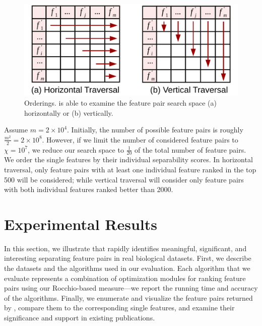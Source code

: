 
\begin{figure}[h]
 \centering
 \vspace{-5mm}
 \includegraphics[width=0.85\linewidth]{fig/traversal.pdf}
 \vspace{-5mm}
\caption{\traversal Orderings. \genviz is able to examine the feature pair search space (a) horizontally or (b) vertically.}
\vspace{-5mm}
\label{fig:traversal}
\end{figure}

\begin{example}[\traversal]
Assume $m=2\times 10^4$. Initially, the number of possible feature pairs is roughly $\frac{m^2}{2}=2\times 10^8$. However, if we limit the number of considered feature pairs to $\chi=10^7$, we reduce our search space to $\frac{1}{20}$ of the total number of feature pairs. We order the single features by their individual separability scores. In horizontal traversal, only feature pairs with at least one individual feature ranked in the top 500 will be considered; while vertical traversal will consider only feature pairs with both individual features ranked better than 2000.
\label{examp:traversal}
\end{example}


\section{Experimental Results}
\label{sec:exp}
In this section, we  illustrate that \genviz 
rapidly identifies meaningful, significant, and interesting 
separating feature pairs in real biological datasets. 
First, we describe the datasets and the algorithms used 
in our evaluation. 
Each algorithm that we evaluate 
represents a combination of optimization modules 
for ranking \topk feature pairs using our 
Rocchio-based measure---we report the running time 
and accuracy 
of the algorithms. 
Finally, we enumerate and visualize 
the \topk feature pairs returned by \genviz, 
compare them to the corresponding \topk single features, 
and examine their significance and 
support in existing publications.

